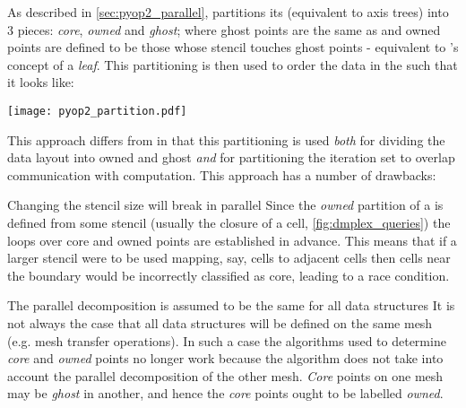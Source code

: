 \documentclass[thesis]{subfiles}
\begin{document}
\begin{pyopcompare}
  As described in \cref{sec:pyop2_parallel},  partitions its  (equivalent to  axis trees) into 3 pieces: \textit{core}, \textit{owned} and \textit{ghost};
  where ghost points are the same as  and owned points are defined to be those whose stencil touches ghost points - equivalent to 's concept of a \textit{leaf}.
  This partitioning is then used to order the data in the  such that it looks like:

  \begin{center}
    \texttt{[image: pyop2\_partition.pdf]}
  \end{center}

  This approach differs from  in that this partitioning is used \textit{both} for dividing the data layout into owned and ghost \textit{and} for partitioning the iteration set to overlap communication with computation.
  This approach has a number of drawbacks:  %

  \begin{paragraph}{Changing the stencil size will break in parallel}
    Since the \textit{owned} partition of a  is defined from some stencil (usually the closure of a cell, \cref{fig:dmplex_queries}) the loops over core and owned points are established in advance.
    This means that if a larger stencil were to be used mapping, say, cells to adjacent cells then cells near the boundary would be incorrectly classified as core, leading to a race condition.
  \end{paragraph}

  \begin{paragraph}{The parallel decomposition is assumed to be the same for all data structures}
    It is not always the case that all data structures will be defined on the same mesh (e.g. mesh transfer operations).
    In such a case the algorithms used to determine \textit{core} and \textit{owned} points no longer work because the algorithm does not take into account the parallel decomposition of the other mesh.
    \textit{Core} points on one mesh may be \textit{ghost} in another, and hence the \textit{core} points ought to be labelled \textit{owned}.
  \end{paragraph}
\end{pyopcompare}
\end{document}
